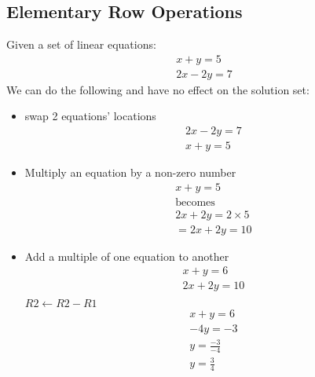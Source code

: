 \documentclass[11pt]{book}
\begin{document}
\subsection{Elementary Row Operations}
\par{Given a set of linear equations: 
\begin{align*}
	x+y=5 \\
	2x-2y=7
\end{align*}
We can do the following and have no effect on the solution set:
\begin{itemize}
	\item{swap 2 equations' locations}
		\begin{align*}
			2x-2y=7 \\
			x+y=5
		\end{align*}
	\item{Multiply an equation by a non-zero number}
		\begin{align*}
			x+y=5 \\
			\text{becomes} \\
			2x+2y=2 \times 5 \\
			= 2x +2y=10
		\end{align*}
	\item{Add a multiple of one equation to another}
		\begin{align*}
			x+y=6 \\
			2x+2y=10 \\
		\end{align*}
		$R2\leftarrow R2-R1$
		\begin{align*}
			x+y=6 \\
			-4y=-3 \\
			y=\frac{-3}{-4} \\
			y=\frac{3}{4}
		\end{align*}
\end{itemize}
}
\end{document}
